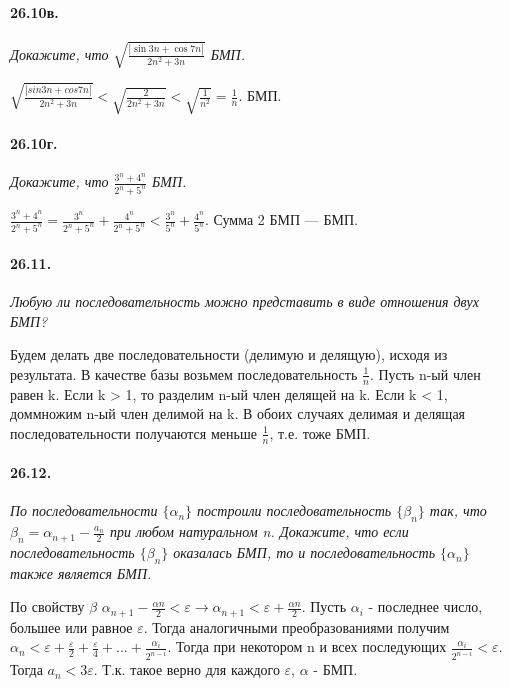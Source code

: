 \documentclass{book}
\begin{document}
\paragraph{26.10в.}
\textit{Докажите, что $\sqrt{\frac{|\sin 3n + \cos 7n|}{2n^2 + 3n}}$ БМП.}

$\sqrt{\frac{|sin 3n + cos 7n|}{2n^2+3n}} < \sqrt{\frac{2}{2n^2+3n}} < \sqrt{\frac{1}{n^2}} = \frac{1}{n}$. БМП.

\paragraph{26.10г.}
\textit{Докажите, что $\frac{3^n + 4^n}{2^n + 5^n}$ БМП.}

$\frac{3^n+4^n}{2^n+5^n} = \frac{3^n}{2^n+5^n} + \frac{4^n}{2^n + 5^n} < \frac{3^n}{5^n} + \frac{4^n}{5^n}$. Сумма 2 БМП — БМП.

\paragraph{26.11.}
\textit{Любую ли последовательность можно представить в виде отношения двух БМП?}

Будем делать две последовательности (делимую и делящую), исходя из результата. В качестве базы возьмем последовательность $\frac{1}{n}$. Пусть n-ый член равен k. Если k > 1, то разделим n-ый член делящей на k. Если k < 1, доммножим n-ый член делимой на k. В обоих случаях делимая и делящая последовательности получаются меньше $\frac{1}{n}$, т.е. тоже БМП.

\paragraph{26.12.}
\textit{По последовательности $\{\alpha_n\}$ построили последовательность $\{\beta_n\}$ так, что $\beta_n = \alpha_{n + 1} - \frac{a_n}{2}$ при любом натуральном n. Докажите, что если последовательность $\{\beta_n\}$ оказалась БМП, то и последовательность $\{\alpha_n\}$ также является БМП.}

По свойству $\beta$ $\alpha_{n+1} - \frac{\alpha{n}}{2} < \varepsilon \rightarrow \alpha_{n+1} < \varepsilon + \frac{\alpha{n}}{2}$. Пусть $\alpha_i$ - последнее число, большее или равное $\varepsilon$. Тогда аналогичными преобразованиями получим $\alpha_n < \varepsilon + \frac{\varepsilon}{2} + \frac{\varepsilon}{4} + ... + \frac{\alpha_i}{2^{n-i}}$. Тогда при некотором n и всех последующих $\frac{\alpha_i}{2^{n-i}} < \varepsilon$. Тогда $a_n < 3 \varepsilon$. Т.к. такое верно для каждого $\varepsilon$, $\alpha$ - БМП.
\end{document}
